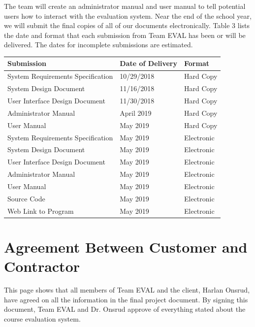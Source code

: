 \documentclass{article}
\begin{document}
The team will create an administrator manual and user manual to tell potential users how to interact with the evaluation system. Near the end of the school year, we will submit the final copies of all of our documents electronically. Table 3 lists the date and format that each submission from Team EVAL has been or will be delivered. The dates for incomplete submissions are estimated.
\newpage

\begin{center}
\begin{tabular}{|p{6cm}|p{3cm}|p{3cm}|} 
\hline
\textbf{Submission} & \textbf{Date of Delivery} & \textbf{Format} \\
\hline
System Requirements Specification & 10/29/2018 & Hard Copy\\ 
\hline
System Design Document & 11/16/2018 & Hard Copy\\ 
\hline
User Interface Design Document & 11/30/2018 & Hard Copy\\ 
\hline
Administrator Manual & April 2019 & Hard Copy\\ 
\hline
User Manual & May 2019 & Hard Copy\\ 
\hline
System Requirements Specification & May 2019 & Electronic\\ 
\hline
System Design Document & May 2019 & Electronic\\ 
\hline
User Interface Design Document & May 2019 & Electronic\\ 
\hline
Administrator Manual & May 2019 & Electronic\\ 
\hline
User Manual & May 2019 & Electronic\\ 
\hline
Source Code & May 2019 & Electronic\\ 
\hline
Web Link to Program & May 2019 & Electronic\\ 
\hline
\end{tabular}
\end{center}

\newpage
\section{Agreement Between Customer and Contractor}

This page shows that all members of Team EVAL and the client, Harlan Onsrud, have agreed on all the information in the final project document. By signing this document, Team EVAL and Dr. Onsrud approve of everything stated about the course evaluation system.
\end{document}
